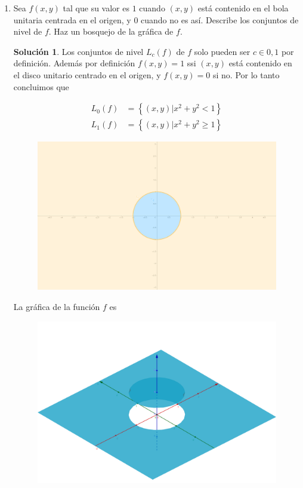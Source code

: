 \documentclass[letterpaper]{article}
\theoremstyle{definition}
\theoremstyle{lemathm}
\theoremstyle{lemathm}
\newtheorem{sol}{Solución}
\theoremstyle{lemathm}
\theoremstyle{lemademthm}
\newcommand{\pars}[1]{\left( #1 \right) }
\newcommand{\set}[1]{\left \{ #1 \right\} }
\newcommand{\1}{\mathbbm{1}}
\begin{document}
\begin{enumerate}
		\newpage

		\item Sea $f(x,y)$ tal que su valor es $1$ cuando $(x,y)$ está contenido en el bola unitaria centrada en el origen, y $0$ cuando no es así. Describe los conjuntos de nivel de $f$. Haz un bosquejo de la gráfica de $f$.
		
		\begin{sol}
			Los conjuntos de nivel $L_c(f)$ de $f$ solo pueden ser $c \in {0,1}$ por definición. Además por definición $f(x,y) = 1$ ssi $(x,y)$ está contenido en el disco unitario centrado en el origen, y $f(x,y) = 0$ si no. Por lo tanto concluimos que

			\begin{align*}
				L_0(f) &= \set{\pars{x,y} | x^2+y^2<1}\\
				L_1(f) &= \set{\pars{x,y} | x^2+y^2\geq 1}
			\end{align*}

			\begin{figure}[h!]
				\includegraphics{Images/8.1.png}
				\centering
			\end{figure}

			La gráfica de la función $f$ es

			\begin{figure}[h!]
				\includegraphics[scale=0.1]{Images/8.2.png}
				\centering
			\end{figure}
		\end{sol}


\end{enumerate}
\end{document}
